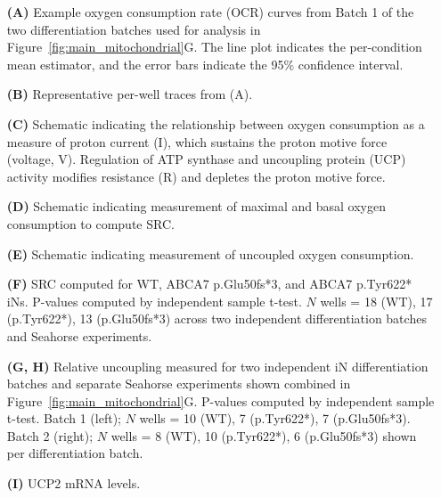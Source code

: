  \begin{itemize}
    \item[\textbf{(A)}] Example oxygen consumption rate (OCR) curves from Batch 1 of the two differentiation batches used for analysis in Figure~\ref{fig:main_mitochondrial}G. The line plot indicates the per-condition mean estimator, and the error bars indicate the 95\% confidence interval. 
    \item[\textbf{(B)}] Representative per-well traces from (A). 
    \item[\textbf{(C)}] Schematic indicating the relationship between oxygen consumption as a measure of proton current (I), which sustains the proton motive force (voltage, V). Regulation of ATP synthase and uncoupling protein (UCP) activity modifies resistance (R) and depletes the proton motive force.
    \item[\textbf{(D)}] Schematic indicating measurement of maximal and basal oxygen consumption to compute SRC.
    \item[\textbf{(E)}] Schematic indicating measurement of uncoupled oxygen consumption.
    \item[\textbf{(F)}] SRC computed for WT, ABCA7 p.Glu50fs*3, and ABCA7 p.Tyr622* iNs. P-values computed by independent sample t-test. $N$ wells = 18 (WT), 17 (p.Tyr622*), 13 (p.Glu50fs*3) across two independent differentiation batches and Seahorse experiments. 
    \item[\textbf{(G, H)}] Relative uncoupling measured for two independent iN differentiation batches and separate Seahorse experiments shown combined in Figure~\ref{fig:main_mitochondrial}G. P-values computed by independent sample t-test. Batch 1 (left); $N$ wells = 10 (WT), 7 (p.Tyr622*), 7 (p.Glu50fs*3). Batch 2 (right); $N$ wells = 8 (WT), 10 (p.Tyr622*), 6 (p.Glu50fs*3) shown per differentiation batch.
    \item[\textbf{(I)}] UCP2 mRNA levels. 
 \end{itemize}